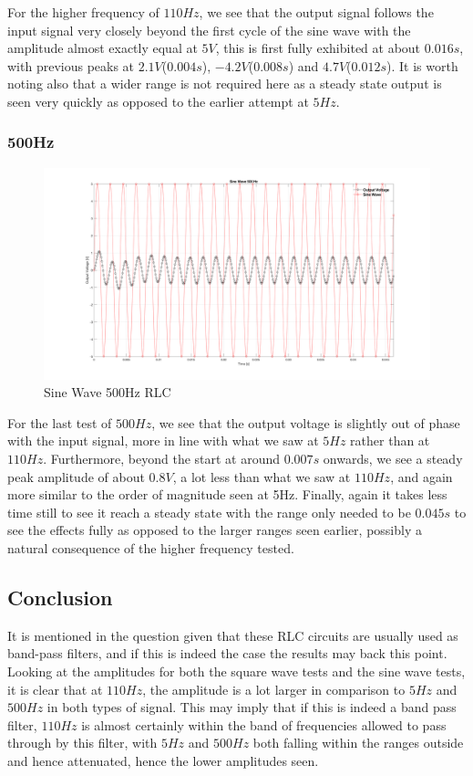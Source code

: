 \documentclass[a4paper, 12pt]{article}
\begin{document}
For the higher frequency of $110Hz$, we see that the output signal follows the input signal very closely beyond the first cycle of the sine wave with the amplitude almost exactly equal at $5V$, this is first fully exhibited at about $0.016s$, with previous peaks at $2.1V$($0.004s$), $-4.2V$($0.008s$) and $4.7V$($0.012s$). It is worth noting also that a wider range is not required here as a steady state output is seen very quickly as opposed to the earlier attempt at $5Hz$.

\subsubsection{500Hz}

\begin{figure}[ht]
\centering
\includegraphics[width=\textwidth]{ex3/Sine_Wave_500_Hz.png}
\caption{Sine Wave 500Hz RLC}
\end{figure}

For the last test of $500Hz$, we see that the output voltage is slightly out of phase with the input signal, more in line with what we saw at $5Hz$ rather than at $110Hz$. Furthermore, beyond the start at around $0.007s$ onwards, we see a steady peak amplitude of about $0.8V$, a lot less than what we saw at $110Hz$, and again more similar to the order of magnitude seen at 5Hz. Finally, again it takes less time still to see it reach a steady state with the range only needed to be $0.045s$ to see the effects fully as opposed to the larger ranges seen earlier, possibly a natural consequence of the higher frequency tested.

\subsection{Conclusion}

It is mentioned in the question given that these RLC circuits are usually used as band-pass filters, and if this is indeed the case the results may back this point. Looking at the amplitudes for both the square wave tests and the sine wave tests, it is clear that at $110Hz$, the amplitude is a lot larger in comparison to $5Hz$ and $500Hz$ in both types of signal. This may imply that if this is indeed a band pass filter, $110Hz$ is almost certainly within the band of frequencies allowed to pass through by this filter, with $5Hz$ and $500Hz$ both falling within the ranges outside and hence attenuated, hence the lower amplitudes seen.
\end{document}
